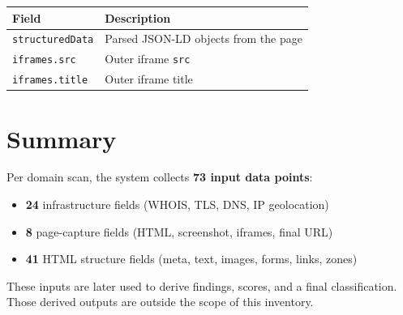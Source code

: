 \documentclass[11pt,a4paper]{article}
\begin{document}
\begin{tabular}{@{}p{3.8cm}p{9.4cm}@{}}
  \toprule
  \textbf{Field} & \textbf{Description} \\
  \midrule
  \texttt{structuredData} & Parsed JSON-LD objects from the page \\
  \texttt{iframes.src} & Outer iframe \texttt{src} \\
  \texttt{iframes.title} & Outer iframe title \\
  \bottomrule
\end{tabular}

\section*{Summary}

Per domain scan, the system collects \textbf{73 input data points}:
\begin{itemize}
  \item \textbf{24} infrastructure fields (WHOIS, TLS, DNS, IP geolocation)
  \item \textbf{8} page-capture fields (HTML, screenshot, iframes, final URL)
  \item \textbf{41} HTML structure fields (meta, text, images, forms, links, zones)
\end{itemize}

These inputs are later used to derive findings, scores, and a final classification. Those derived outputs are outside the scope of this inventory.
\end{document}
